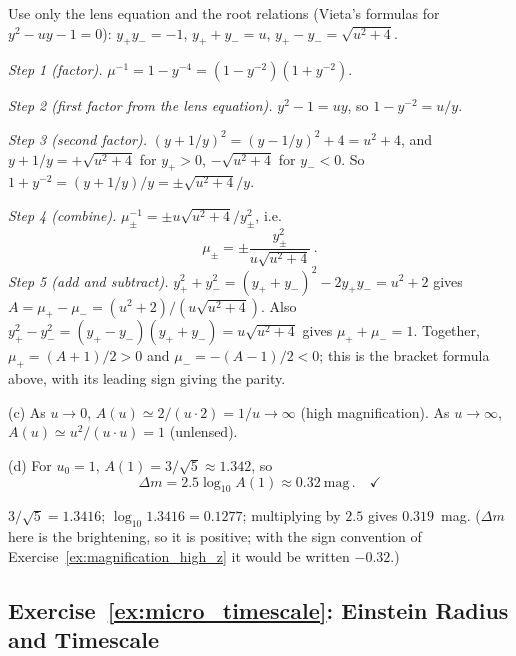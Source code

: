 \begin{derivation}
Use only the lens equation and the root relations (Vieta's formulas for
$y^2 - uy - 1 = 0$): $y_+y_- = -1$, $y_+ + y_- = u$, $y_+ - y_- = \sqrt{u^2+4}$.

\textit{Step 1 (factor).}  $\mu^{-1} = 1 - y^{-4} = (1 - y^{-2})(1 + y^{-2})$.

\textit{Step 2 (first factor from the lens equation).}  $y^2 - 1 = uy$, so
$1 - y^{-2} = u/y$.

\textit{Step 3 (second factor).}  $(y + 1/y)^2 = (y - 1/y)^2 + 4 = u^2 + 4$, and
$y + 1/y = +\sqrt{u^2+4}$ for $y_+ > 0$, $-\sqrt{u^2+4}$ for $y_- < 0$.  So
$1 + y^{-2} = (y + 1/y)/y = \pm\sqrt{u^2+4}/y$.

\textit{Step 4 (combine).}  $\mu_\pm^{-1} = \pm u\sqrt{u^2+4}/y_\pm^2$, i.e.
\begin{equation*}
    \mu_\pm = \pm\frac{y_\pm^2}{u\sqrt{u^2+4}}\,.
\end{equation*}
\textit{Step 5 (add and subtract).}  $y_+^2 + y_-^2 = (y_+ + y_-)^2 - 2y_+y_- =
u^2 + 2$ gives $A = \mu_+ - \mu_- = (u^2+2)/(u\sqrt{u^2+4})$.  Also
$y_+^2 - y_-^2 = (y_+ - y_-)(y_+ + y_-) = u\sqrt{u^2+4}$ gives
$\mu_+ + \mu_- = 1$.  Together, $\mu_+ = (A+1)/2 > 0$ and
$\mu_- = -(A-1)/2 < 0$; this is the bracket formula above, with its
leading sign giving the parity.
\end{derivation}

(c) As $u\to0$, $A(u) \simeq 2/(u\cdot2) = 1/u \to \infty$
(high magnification).  As $u\to\infty$, $A(u) \simeq u^2/(u\cdot u) = 1$
(unlensed). \checkmark

(d) For $u_0 = 1$, $A(1) = 3/\sqrt5 \approx 1.342$, so
\begin{equation*}
    \Delta m = 2.5\log_{10}A(1) \approx 0.32~\text{mag} \,. \quad \checkmark
\end{equation*}

\begin{derivation}
$3/\sqrt5 = 1.3416$; $\log_{10}1.3416 = 0.1277$; multiplying by $2.5$ gives
$0.319$~mag.  ($\Delta m$ here is the brightening, so it is positive; with the
sign convention of Exercise~\ref{ex:magnification_high_z} it would be written $-0.32$.)
\end{derivation}


\subsection*{Exercise~\ref{ex:micro_timescale}: Einstein Radius and Timescale}

